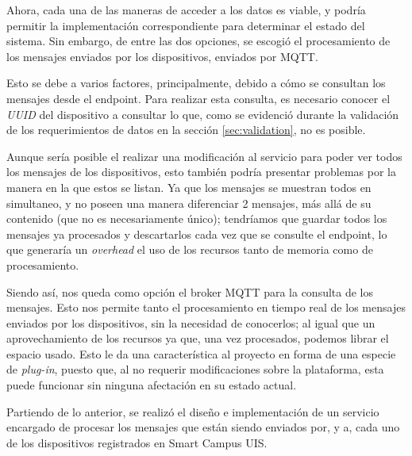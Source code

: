 Ahora, cada una de las maneras de acceder a los datos es viable, y podría permitir la implementación correspondiente para determinar el estado del sistema. Sin embargo, de entre las dos opciones, se escogió el procesamiento de los mensajes enviados por los dispositivos, enviados por MQTT. 

Esto se debe a varios factores, principalmente, debido a cómo se consultan los mensajes desde el endpoint. Para realizar esta consulta, es necesario conocer el \textit{UUID} del dispositivo a consultar lo que, como se evidenció durante la validación de los requerimientos de datos en la sección \ref{sec:validation}, no es posible.

Aunque sería posible el realizar una modificación al servicio para poder ver todos los mensajes de los dispositivos, esto también podría presentar problemas por la manera en la que estos se listan. Ya que los mensajes se muestran todos en simultaneo, y no poseen una manera diferenciar 2 mensajes, más allá de su contenido (que no es necesariamente único); tendríamos que guardar todos los mensajes ya procesados y descartarlos cada vez que se consulte el endpoint, lo que generaría un \textit{overhead} el uso de los recursos tanto de memoria como de procesamiento.

Siendo así, nos queda como opción el broker MQTT para la consulta de los mensajes. Esto nos permite tanto el procesamiento en tiempo real de los mensajes enviados por los dispositivos, sin la necesidad de conocerlos; al igual que un aprovechamiento de los recursos ya que, una vez procesados, podemos librar el espacio usado. Esto le da una característica al proyecto en forma de una especie de \textit{plug-in}, puesto que, al no requerir modificaciones sobre la plataforma, esta puede funcionar sin ninguna afectación en su estado actual.

Partiendo de lo anterior, se realizó el diseño e implementación de un servicio encargado de procesar los mensajes que están siendo enviados por, y a, cada uno de los dispositivos registrados en Smart Campus UIS. 



